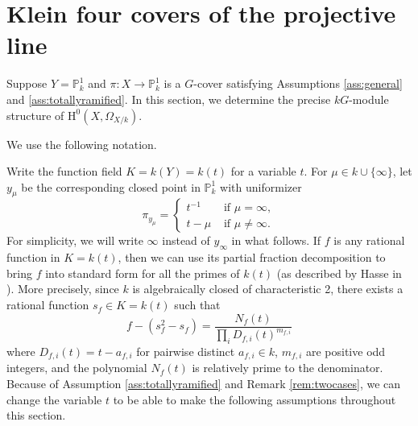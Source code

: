 \documentclass{amsart}
\numberwithin{equation}{section}
\numberwithin{table}{section}
\theoremstyle{plain}
\theoremstyle{definition}
\theoremstyle{remark}
\newcommand{\HH}{\mathrm{H}}
\begin{document}

\section{Klein four covers of the projective line}
\label{s:KleinfourP1}

Suppose $Y=\mathbb{P}^1_k$ and $\pi:X\to \mathbb{P}^1_k$ is a $G$-cover satisfying Assumptions \ref{ass:general} and \ref{ass:totallyramified}. In this section, we determine the precise $kG$-module structure of $\HH^0(X,\Omega_{X/k})$. 

We use the following notation. 

Write the function field $K=k(Y)=k(t)$ for a variable $t$. For $\mu\in k\cup\{\infty\}$, let $y_\mu$ be the corresponding closed point in $\mathbb{P}^1_k$ with uniformizer
\begin{equation}
\label{eq:uniformizer}
\pi_{y_\mu}=\left\{\begin{array}{cl}
t^{-1} & \mbox{ if $\mu=\infty$},\\
t-\mu & \mbox{ if $\mu\ne \infty$}.
\end{array}\right.
\end{equation}
For simplicity, we will write $\infty$ instead of $y_\infty$ in what follows.
If $f$ is any rational function in $K=k(t)$, then we can use its partial fraction decomposition to bring $f$ into standard form for all the primes of $k(t)$ (as described by Hasse in \cite{HasseCrelle1935}). More precisely, since $k$ is algebraically closed of characteristic 2, there exists a rational function $s_f\in K=k(t)$ such that
\begin{equation}
\label{eq:Hassestandard}
f- (s_f^2-s_f)=\frac{N_f(t)}{\prod_i D_{f,i}(t)^{m_{f,i}}}
\end{equation}
where $D_{f,i}(t)=t-a_{f,i}$ for pairwise distinct $a_{f,i}\in  k$, $m_{f,i}$ are positive odd integers, and the polynomial $N_f(t)$ is relatively prime to the denominator.
Because of Assumption \ref{ass:totallyramified} and Remark \ref{rem:twocases}, we can change the variable $t$ to be able to make the following assumptions throughout this section.
\end{document}
